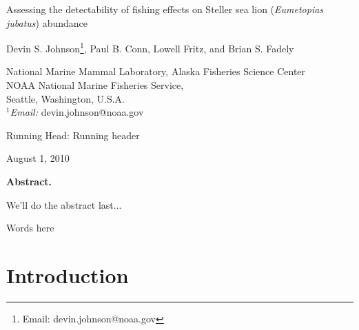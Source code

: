 \documentclass[12pt]{article}
\begin{document}
\renewcommand{\baselinestretch}{1.8}\normalsize

\begin{center}
{\LARGE Assessing the detectability of fishing effects on Steller sea lion ({\it Eumetopias jubatus}) abundance}\vspace{0.5in}

{\large Devin S. Johnson\footnote[1]{Email: devin.johnson@noaa.gov}, Paul B. Conn, Lowell Fritz, and Brian S. Fadely}

\hrulefill

\renewcommand{\baselinestretch}{1.25}\large
National Marine Mammal Laboratory, Alaska Fisheries Science Center\\
NOAA National Marine Fisheries Service,\\
Seattle, Washington, U.S.A.\\
$^1${\em Email:} devin.johnson@noaa.gov

\hrulefill

\normalsize
{\sc Running Head}: Running header \bigskip

August 1, 2010
\end{center}


\clearpage




\centerline{\bf Abstract.} 

We'll do the abstract last...

\noindent \hrulefill

 Words here

\clearpage

\renewcommand{\baselinestretch}{1.8}\normalsize




\section{Introduction}

\citet{Holmes:2007ys}





\end{document}
